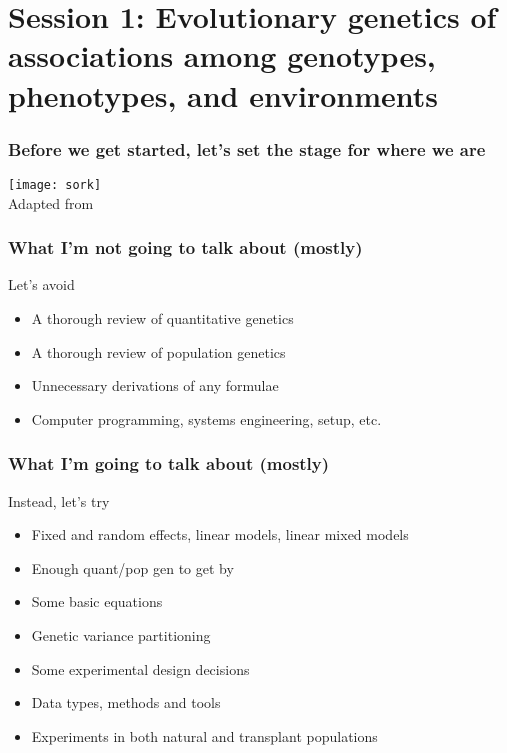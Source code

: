 
\section[Session 1]{Session 1: Evolutionary genetics of associations among
genotypes, phenotypes, and environments}

\begin{frame}
\frametitle{Before we get started, let's set the stage for where we are}
\begin{block}{}
\centering
\texttt{[image: sork]}\\
\tiny
Adapted from \citet[Figure 1]{Sork:2013tb}
\end{block}{}
\end{frame}

\begin{frame}
\frametitle{What I'm not going to talk about (mostly)}
\begin{block}{Let's avoid}
\begin{itemize}
\item{A thorough review of quantitative genetics}
\item{A thorough review of population genetics}
\item{Unnecessary derivations of any formulae}
\item{Computer programming, systems engineering, setup, etc.}
\end{itemize}
\end{block}
\end{frame}

\begin{frame}
\frametitle{What I'm going to talk about (mostly)}
\begin{block}{Instead, let's try}
\begin{itemize}
\item{Fixed and random effects, linear models, linear mixed models}
\item{Enough quant/pop gen to get by}
\item{Some basic equations}
\item{Genetic variance partitioning}
\item{Some experimental design decisions}
\item{Data types, methods and tools}
\item{Experiments in both natural and transplant populations}
\end{itemize}
\end{block}
\end{frame}

